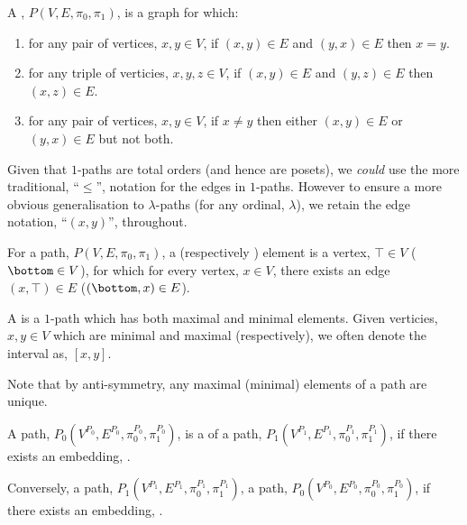 \documentclass[a4paper]{amsart}
\begin{document}
\begin{definition}
A , $P(V, E, \pi_0, \pi_1)$, is a graph for which:

\begin{enumerate}
\item {} for any pair of vertices, $x, y \in V$, if $(x,y) \in E$ and
$(y,x) \in E$ then $x = y$.

\item {} for any triple of verticies, $x, y, z \in V$, 
if $(x,y) \in E$ and $(y,z) \in E$ then $(x,z) \in E$.

\item {} for any pair of vertices, $x, y \in V$, if $x \neq y$ then
either $(x,y) \in E$ or $(y,x) \in E$ but not both.
\end{enumerate}
\end{definition}

Given that $1$-paths are total orders (and hence are posets), we \emph{could} use the more
traditional, ``$\leq$'', notation for the edges in $1$-paths. However to ensure a more
obvious generalisation to $\lambda$-paths (for any ordinal, $\lambda$), we retain the edge
notation, ``$(x,y)$'', throughout.

\begin{definition}
For a path, $P(V, E, \pi_0, \pi_1)$, a  (respectively
) element is a vertex, $\top \in V$ ($\bottom \in V$), for which for
every vertex, $x \in V$, there exists an edge $(x,\top) \in E$ ($(\bottom, x) \in E$).

A  is a $1$-path which has both maximal and minimal elements. Given 
verticies, $x, y \in V$ which are minimal and maximal (respectively), we often denote the 
interval as, $[x,y]$.
\end{definition}

Note that by anti-symmetry, any maximal (minimal) elements of a path are unique.

\begin{definition}
A path, $P_0(V^{P_0}, E^{P_0}, \pi^{P_0}_0, \pi^{P_0}_1)$, is a  of a
path, $P_1(V^{P_1}, E^{P_1}, \pi^{P_1}_0, \pi^{P_1}_1)$, if there exists an embedding,
.

Conversely, a path, $P_1(V^{P_1}, E^{P_1}, \pi^{P_1}_0, \pi^{P_1}_1)$, 
a path, $P_0(V^{P_0}, E^{P_0}, \pi^{P_0}_0, \pi^{P_0}_1)$, if there exists an embedding,
.
\end{definition}
\end{document}
